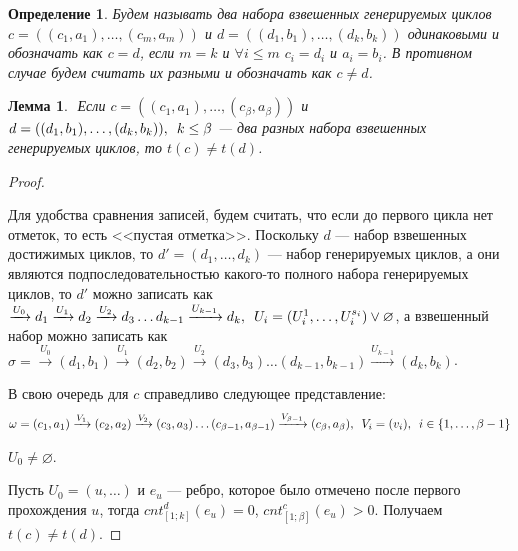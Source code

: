 \documentclass{article}
\newcommand{\RN}[1]{
\textup{\uppercase\expandafter{\romannumeral#1}}
}
\newcommand{\squad}{
    \hspace{0.5em}
}
\newtheorem{lemma}{Лемма}
\newtheorem{definition}{Определение}
\begin{document}
\begin{definition}
    Будем называть два набора взвешенных генерируемых циклов $c = ((c_{1}, a_{1}), \ldots, (c_{m}, a_{m}))$ и $d = ((d_{1}, b_{1}), \ldots, (d_{k}, b_{k}))$ одинаковыми и обозначать как $c = d$, если $m = k$ и $\forall i \leq m$ $c_{i} = d_{i}$ и $a_{i} = b_{i}$.
    В противном случае будем считать их разными и обозначать как $c \neq d$.
\end{definition}

\begin{lemma} $ $
        \label{lemma:beta}
        Если $c = ((c_{1}, a_{1}), \ldots, (c_{\beta}, a_{\beta}))$ и $d = ((d_{1}, b_{1}), \ldots, (d_{k}, b_{k})), \squad k \leq \beta$ --- два разных набора взвешенных генерируемых циклов, то $t(c) \neq t(d)$.
\end{lemma}
\begin{proof} $ $

    Для удобства сравнения записей, будем считать, что если до первого цикла нет отметок, то есть <<пустая отметка>>.
    Поскольку $d$ --- набор взвешенных достижимых циклов, то $d' = (d_{1}, \ldots, d_{k})$ --- набор генерируемых циклов, а они являются подпоследовательностью какого-то полного набора генерируемых циклов, то $d'$ можно записать как $\xrightarrow{U_{0}} d_{1} \xrightarrow{U_{1}}d_{2}\xrightarrow{U_{2}}d_{3}\ldots d_{k - 1}\xrightarrow{U_{k - 1}}d_{k}, \squad U_{i} = (U_{i}^{1},\ldots, U_{i}^{s_{i}}) \lor \varnothing$, а взвешенный набор можно записать как $\sigma = \xrightarrow{U_{0}} (d_{1}, b_{1}) \xrightarrow{U_{1}}(d_{2}, b_{2})\xrightarrow{U_{2}}(d_{3}, b_{3})\ldots (d_{k - 1}, b_{k - 1})\xrightarrow{U_{k - 1}}(d_{k}, b_{k})$.

    В свою очередь для $c$ справедливо следующее представление: 
    \begin{gather*}
        \omega = (c_{1}, a_{1}) \xrightarrow{V_{1}}(c_{2}, a_{2}) \xrightarrow{V_{2}}(c_{3}, a_{3}) \ldots (c_{\beta - 1}, a_{\beta - 1}) \xrightarrow{V_{\beta - 1}} (c_{\beta}, a_{\beta}), \squad V_{i} = (v_{i}), \squad i \in \{1, \ldots, \beta - 1\}
    \end{gather*}

    \RN{1} $U_{0} \neq \varnothing$.

    Пусть $U_{0} = (u, \ldots)$ и $e_{u}$ --- ребро, которое было отмечено после первого прохождения $u$, тогда $cnt_{[1; k]}^{d}(e_{u}) = 0$, $cnt_{[1; \beta]}^{c}(e_{u}) > 0$. Получаем $t(c) \neq t(d)$.

    \medskip


\end{proof}
\end{document}
